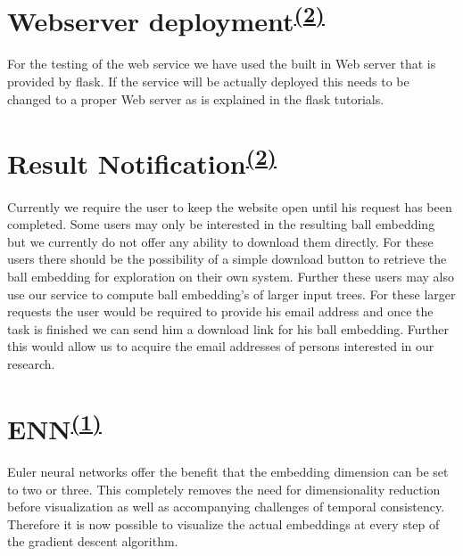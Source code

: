 \section[Webserver deployment]{Webserver deployment\textsuperscript{\hyperref[Oliver]{(2)}}}
For the testing of the web service we have used the built in Web server that is provided by flask. If the service will be actually deployed this needs to be changed to a proper Web server as is explained in the flask tutorials.

\section[Result Notification]{Result Notification\textsuperscript{\hyperref[Oliver]{(2)}}}
Currently we require the user to keep the website open until his request has been completed. Some users may only be interested in the resulting ball embedding but we currently do not offer any ability to download them directly. For these users there should be the possibility of a simple download button to retrieve the ball embedding for exploration on their own system. Further these users may also use our service to compute ball embedding's of larger input trees. For these larger requests the user would be required to provide his email address and once the task is finished we can send him a download link for his ball embedding. Further this would allow us to acquire the email addresses of persons interested in our research.

\section[ENN]{ENN\textsuperscript{\hyperref[Jan]{(1)}}}
Euler neural networks \cite{dong2020learning} offer the benefit that the embedding dimension can be set to two or three. This completely removes the need for dimensionality reduction before visualization as well as accompanying challenges of temporal consistency. Therefore it is now possible to visualize the actual embeddings at every step of the gradient descent algorithm.

